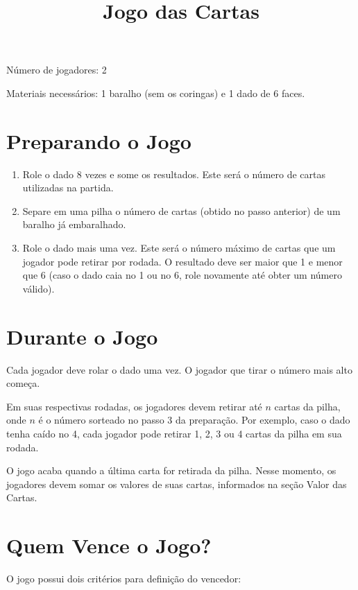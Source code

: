 \documentclass[12pt, a4paper]{article}
\begin{document}
\title{\textbf{Jogo das Cartas}}
\author{}
\date{}
\maketitle


Número de jogadores: 2

Materiais necessários: 1 baralho (sem os coringas) e 1 dado de 6 faces.

\section*{Preparando o Jogo}
\begin{enumerate}
    \item Role o dado 8 vezes e some os resultados. Este será o número de cartas utilizadas na partida.
    \item Separe em uma pilha o número de cartas (obtido no passo anterior) de um baralho já embaralhado.
    \item Role o dado mais uma vez. Este será o número máximo de cartas que um jogador pode retirar por rodada. O resultado deve ser maior que 1 e menor que 6 (caso o dado caia no 1 ou no 6, role novamente até obter um número válido).
\end{enumerate}

\section*{Durante o Jogo}
Cada jogador deve rolar o dado uma vez. O jogador que tirar o número mais alto começa.

\medskip

Em suas respectivas rodadas, os jogadores devem retirar até $n$ cartas da pilha, onde $n$ é o número sorteado no passo 3 da preparação. Por exemplo, caso o dado tenha caído no 4, cada jogador pode retirar 1, 2, 3 ou 4 cartas da pilha em sua rodada.

\medskip

O jogo acaba quando a última carta for retirada da pilha. Nesse momento, os jogadores devem somar os valores de suas cartas, informados na seção Valor das Cartas.

\section*{Quem Vence o Jogo?}
O jogo possui dois critérios para definição do vencedor:
\end{document}
